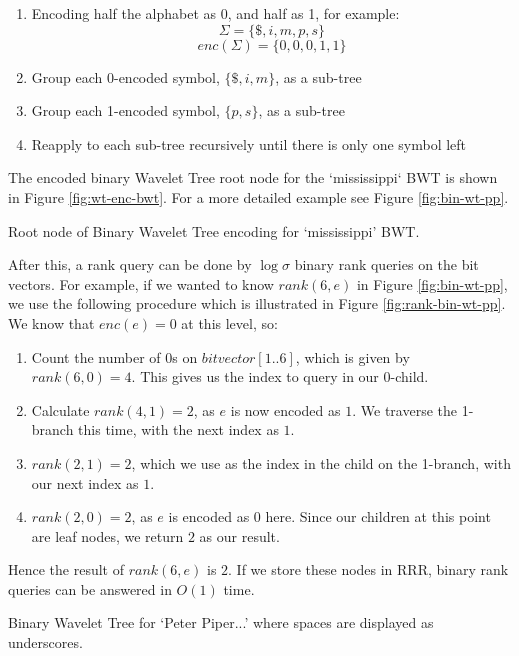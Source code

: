 \begin{enumerate}
    \item
		Encoding half the alphabet as 0, and half as 1, for example:
    		$$\Sigma = \{ \$, i, m, p, s \}$$
			$$enc(\Sigma) = \{ 0, 0, 0, 1, 1 \}$$
    \item
		Group each 0-encoded symbol, $\{ \$, i, m \}$, as a sub-tree
    \item
		Group each 1-encoded symbol, $\{ p, s \}$, as a sub-tree
    \item
		Reapply to each sub-tree recursively until there is only one symbol
    	left
\end{enumerate}

The encoded binary Wavelet Tree root node for the `mississippi` BWT is shown in Figure \ref{fig:wt-enc-bwt}. For a more detailed example see Figure \ref{fig:bin-wt-pp}.


			{Root node of Binary Wavelet Tree encoding for `mississippi' BWT.}


After this, a rank query can be done by $\log \sigma$ binary rank queries 
on the bit vectors. For example, if we wanted to know $rank(6, e)$ in Figure 
\ref{fig:bin-wt-pp}, we use the following procedure which is illustrated in 
Figure \ref{fig:rank-bin-wt-pp}. 
We know that $enc(e) = 0$ at this level, so:

\begin{enumerate}
    \item
		Count the number of $0$s on $bitvector[1..6]$,
		which is given by $rank(6, 0) = 4$. This gives us the index to query in 
		our 0-child.
    \item
		Calculate $rank(4, 1) = 2$, as $e$ is now encoded as $1$. We traverse
    	the 1-branch this time, with the next index as $1$.
    \item
		$rank(2, 1) = 2$, which we use as the index in the child on the
    	1-branch, with our next index as $1$.
    \item
		$rank(2, 0) = 2$, as $e$ is encoded as $0$ here. Since our children at 
		this point are leaf nodes, we return $2$ as our result.
\end{enumerate}

Hence the result of $rank(6, e)$ is $2$. If we store these nodes in RRR, 
binary rank queries can be answered in $O(1)$ time.

			{Binary Wavelet Tree for `Peter Piper...' where spaces are displayed
			as underscores.}
			
